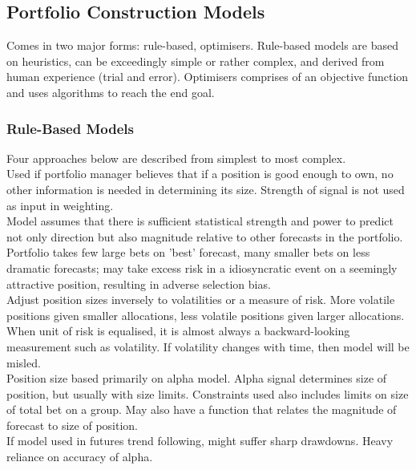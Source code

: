 \subsection{Portfolio Construction Models}

Comes in two major forms: rule-based, optimisers. Rule-based models are based on heuristics, can be exceedingly simple or rather complex, and derived from human experience (trial and error). Optimisers comprises of an objective function and uses algorithms to reach the end goal.

\subsubsection{Rule-Based Models}

Four approaches below are described from simplest to most complex.\\

 Used if portfolio manager believes that if a position is good enough to own, no other information is needed in determining its size. Strength of signal is not used as input in weighting. \\
Model assumes that there is sufficient statistical strength and power to predict not only direction but also magnitude relative to other forecasts in the portfolio. Portfolio takes few large bets on 'best' forecast, many smaller bets on less dramatic forecasts; may take excess risk in a idiosyncratic event on a seemingly attractive position, resulting in adverse selection bias.\\

 Adjust position sizes inversely to volatilities or a measure of risk. More volatile positions given smaller allocations, less volatile positions given larger allocations.\\
When unit of risk is equalised, it is almost always a backward-looking measurement such as volatility. If volatility changes with time, then model will be misled.\\

 Position size based primarily on alpha model. Alpha signal determines size of position, but usually with size limits. Constraints used also includes limits on size of total bet on a group. May also have a function that relates the magnitude of forecast to size of position.\\
If model used in futures trend following, might suffer sharp drawdowns. Heavy reliance on accuracy of alpha.\\

